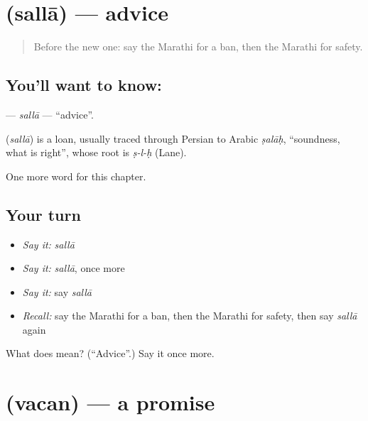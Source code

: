 \section[\texorpdfstring{\mr{सल्ला} (sallā)}{सल्ला (sallā)}]{ (sallā) — advice}

\label{lesson:MR-C265-salla}



\begin{quote}
Before the new one: say the Marathi for a ban, then the Marathi for safety.
\end{quote}

\subsection*{You'll want to know: }
\textbf{} — \emph{sallā} — \textquotedblleft{}advice\textquotedblright{}.

\begin{cousinweb}
\textbf{} (\emph{sallā}) is a loan, usually traced through Persian to Arabic \emph{ṣalāḥ}, \textquotedblleft{}soundness, what is right\textquotedblright{}, whose root is \emph{ṣ-l-ḥ} (Lane).
\end{cousinweb}

\begin{grammarlens}[title={What you've built}]
One more word for this chapter.
\end{grammarlens}

\subsection*{Your turn}
\begin{itemize}
\raggedright
  \item \emph{Say it:} \emph{sallā}
  \item \emph{Say it:} \emph{sallā}, once more
  \item \emph{Say it:} say \emph{sallā}
  \item \emph{Recall:} say the Marathi for a ban, then the Marathi for safety, then say \emph{sallā} again
\end{itemize}

\begin{tcolorbox}[breakable,colback=teal!4,colframe=teal!35!black,title={Before you move on}]
What does  mean? (\textquotedblleft{}Advice\textquotedblright{}.) Say it once more.
\end{tcolorbox}
\section[\texorpdfstring{\mr{वचन} (vacan)}{वचन (vacan)}]{ (vacan) — a promise}

